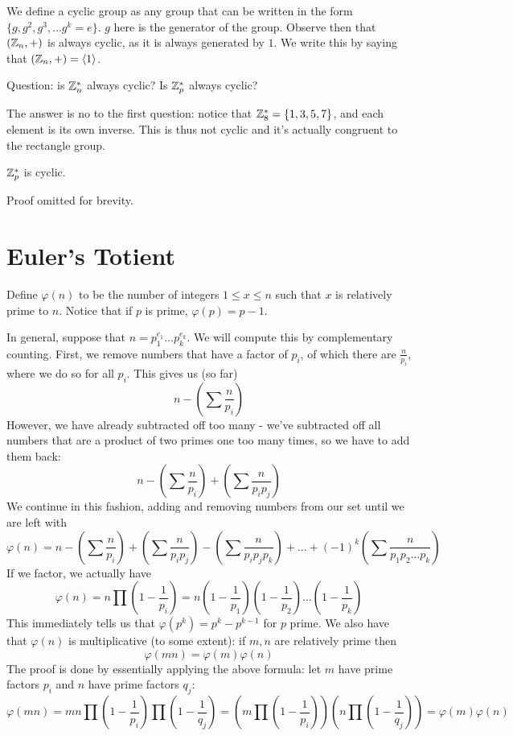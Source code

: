 \documentclass[11pt,twosided]{article}
\begin{document}
We define a cyclic group as any group that can be written in the form $\{g, g^2, g^3, \ldots g^k = e\}$. $g$ here is the generator of the group. Observe then that $(\mathbb Z_n, +)$ is always cyclic, as it is always generated by $1$. We write this by saying that $(\mathbb Z_n, +) = \langle 1 \rangle$. 

Question: is $\mathbb Z_n^*$ always cyclic? Is $\mathbb Z_p^*$ always cyclic? 

The answer is no to the first question: notice that $\mathbb Z_8^* = \{ 1, 3, 5, 7\}$, and each element is its own inverse. This is thus not cyclic and it's actually congruent to the rectangle group. 

\begin{theorem}
$\mathbb Z_p^*$ is cyclic.
\end{theorem}
Proof omitted for brevity. 

\section{Euler's Totient}
Define $\varphi(n)$ to be the number of integers $1 \leq x \leq n$ such that $x$ is relatively prime to $n$. Notice that if $p$ is prime, $\varphi(p) = p-1$. 

In general, suppose that $n = p_1^{e_1} \ldots p_k^{e_k}$. We will compute this by complementary counting. First, we remove numbers that have a factor of $p_i$, of which there are $\frac{n}{p_i}$, where we do so for all $p_i$. This gives us (so far) 
\[
	n - \left(\sum \frac{n}{p_i} \right) 
\]
However, we have already subtracted off too many - we've subtracted off all numbers that are a product of two primes one too many times, so we have to add them back: 
\[
	n - \left(\sum \frac{n}{p_i} \right) + \left(\sum \frac{n}{p_i p_j} \right) 
\]
We continue in this fashion, adding and removing numbers from our set until we are left with 
\[
	\varphi(n) = n - \left(\sum \frac{n}{p_i} \right) + \left(\sum \frac{n}{p_i p_j} \right) - \left(\sum \frac{n}{p_i p_j p_k} \right) + \ldots + (-1)^k \left(\sum \frac{n}{p_1 p_2 \ldots p_k} \right)
\]
If we factor, we actually have 
\[
\varphi(n) = n\prod\left(1 - \frac{1}{p_i} \right) = n  \left(1 - \frac{1}{p_1} \right)\left(1 - \frac{1}{p_2} \right)\ldots \left(1 - \frac{1}{p_k} \right)
\]
This immediately tells us that $\varphi(p^k) = p^k - p^{k-1}$ for $p$ prime. 
We also have that $\varphi(n)$ is multiplicative (to some extent): if $m, n$ are relatively prime then 
\[
	\varphi(mn) = \varphi(m) \varphi(n)
\]
The proof is done by essentially applying the above formula: let $m$ have prime factors $p_i$ and $n$ have prime factors $q_j$:  
\[
	\varphi(mn) = mn \prod \left(1 - \frac{1}{p_i} \right) \prod \left(1 - \frac{1}{q_j} \right) = \left(m\prod \left(1 - \frac{1}{p_i} \right)  \right) \left(n \prod \left(1 - \frac{1}{q_j} \right)  \right) = \varphi(m) \varphi(n)
\]
\end{document}
